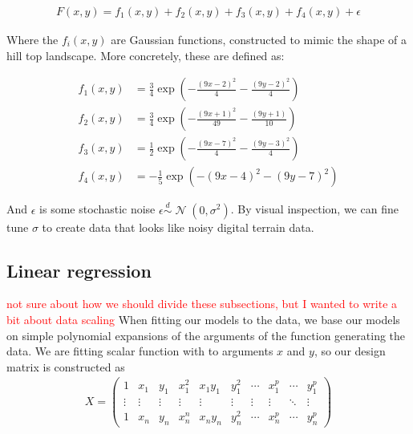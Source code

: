 \documentclass[twocolumn,english,notitlepage]{article}
\newcommand{\comment}[1]{\textcolor{red}{#1}}
\newcommand{\pclosed}[1]{\left(#1\right)}
\newcommand{\exptext}[1]{\operatorname{exp}\pclosed{#1}}
\newcommand{\normal}[2]{\operatorname{\mathcal{N}}\pclosed{#1,#2}}
\newcommand{\distas}{\overset{d}{\sim}}
\begin{document}
    \begin{align}
        F(x,y) = f_1(x,y) + f_2(x,y) + f_3(x,y) + f_4(x,y) + \epsilon \label{eq:met:Franke_Function}
    \end{align}

    Where the $f_i(x,y)$ are Gaussian functions, constructed to mimic the shape of a hill top landscape. More concretely, these are defined as:

    \begin{align} \nonumber
        f_1(x,y) &= \frac{3}{4}\exptext{ -\frac{(9x-2)^2}{4} - \frac{(9y-2)^2}{4} } \nonumber \\
        f_2(x,y) &= \frac{3}{4}\exptext{ -\frac{(9x+1)^2}{49} - \frac{(9y+1)}{10}} \nonumber \\
        f_3(x,y) &= \frac{1}{2}\exptext{ -\frac{(9x-7)^2}{4} - \frac{(9y-3)^2}{4}} \nonumber \\
        f_4(x,y) &= -\frac{1}{5}\exptext{ -(9x-4)^2 - (9y-7)^2} \nonumber
    \end{align}

    And $\epsilon$ is some stochastic noise $\epsilon \distas \normal{0}{\sigma^2}$. By visual inspection, we can fine tune $\sigma$ to create data that looks like noisy digital terrain data.
    
    \subsection{Linear regression}
    \comment{not sure about how we should divide these subsections, but I wanted to write a bit about data scaling}
        When fitting our models to the data, we base our models on simple polynomial expansions of the arguments of the function generating the data. We are fitting scalar function with to arguments $x$ and $y$, so our design matrix is constructed as
        \begin{align}
            X = \begin{pmatrix}
                1 & x_1 & y_1 & x^2_1 & x_1y_1 & y_1^2 & \cdots & x_1^p & \cdots & y_1^p \\
                \vdots & \vdots & \vdots & \vdots & \vdots & \vdots & \vdots & \vdots & \ddots & \vdots \\
                1 & x_n & y_n & x^n_n & x_ny_n & y_n^2 & \cdots & x_n^p & \cdots & y_n^p
            \end{pmatrix}
        \end{align}
    
\end{document}
